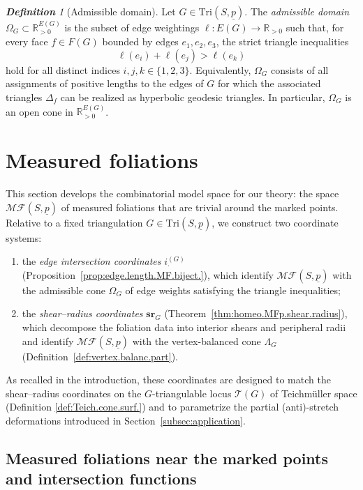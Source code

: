 \documentclass[11pt, letterpaper]{amsart}
\theoremstyle{definition}
\theoremstyle{remark}
\newtheorem{definition}[theorem]{\rm\bf Definition}
\newcommand{\up}{\underline{p}}
\newcommand{\Sp}{(S,\up)}
\newcommand{\TSp}{\text{Tri}\Sp}
\newcommand{\iG}{i^{(G)}}
\newcommand{\cMFp}{\mathcal{MF} (S,\up)}
\newcommand{\cT}{\mathcal{T}}
\newcommand{\bR}{\mathbb{R}}
\newcommand{\DEF}{} \newcommand{\WARN}{\textcolor{red}} \newcommand{\ALT}{\textcolor{brown}} \newcommand{\TODO}{\textcolor{teal}} %
\numberwithin{equation}{section}
\begin{document}
\begin{definition}[Admissible domain]
\label{def:tri.ineq.region}
Let \(G \in \TSp\).
The \DEF{\em admissible domain} \(\Omega_G \subset \bR^{E(G)}_{>0}\) is the subset of edge weightings \(\ell \colon E(G) \to \bR_{>0}\) such that, for every face \(f \in F(G)\) bounded by edges \(e_1, e_2, e_3\), the strict triangle inequalities
\[
  \ell(e_i)+\ell(e_j)>\ell(e_k)
\]
hold for all distinct indices \(i,j,k \in \{1,2,3\}\).
Equivalently, \(\Omega_G\) consists of all assignments of positive lengths to the edges of \(G\) for which the associated triangles \(\Delta_f\) can be realized as hyperbolic geodesic triangles.
In particular, \(\Omega_G\) is an open cone in \(\bR^{E(G)}_{>0}\).
\end{definition}






  \section{Measured foliations}
    \label{sec:MF.}

This section develops the combinatorial model space for our theory: the space \(\cMFp\) of measured foliations that are trivial around the marked points. Relative to a fixed triangulation \(G\in\TSp\), we construct two coordinate systems:
\begin{enumerate}
    \item the \emph{edge intersection coordinates} \(\iG_{\cdot}\) (Proposition~\ref{prop:edge.length.MF.biject.}), which identify \(\cMFp\) with the admissible cone \(\Omega_G\) of edge weights satisfying the triangle inequalities;
    \item the \emph{shear--radius coordinates} \(\mathbf{sr}_G\) (Theorem~\ref{thm:homeo.MFp.shear.radius}), which decompose the foliation data into interior shears and peripheral radii and identify \(\cMFp\) with the vertex-balanced cone \(\Lambda_G\) (Definition~\ref{def:vertex.balanc.part}).
\end{enumerate}
As recalled in the introduction, these coordinates are designed to match the shear--radius coordinates on the $G$-triangulable locus \(\cT(G)\) of Teichm\"uller space (Definition \ref{def:Teich.cone.surf.}) and to parametrize the partial (anti)-stretch deformations introduced in Section~\ref{subsec:application}.



\subsection{Measured foliations near the marked points and intersection functions}
\label{subsec:MF.and.geo.inter.}
\end{document}
